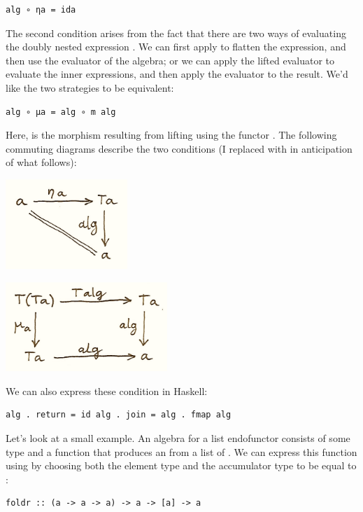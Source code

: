 \begin{verbatim}
alg ∘ ηa = ida
\end{verbatim}

The second condition arises from the fact that there are two ways of
evaluating the doubly nested expression . We can first
apply  to flatten the expression, and then use the evaluator
of the algebra; or we can apply the lifted evaluator to evaluate the
inner expressions, and then apply the evaluator to the result. We'd like
the two strategies to be equivalent:

\begin{verbatim}
alg ∘ μa = alg ∘ m alg
\end{verbatim}

Here,  is the morphism resulting from lifting
 using the functor . The following commuting
diagrams describe the two conditions (I replaced  with
 in anticipation of what follows):

\includegraphics[width=1.81250in]{images/talg1.png}

\includegraphics[width=2.40625in]{images/talg2.png}

We can also express these condition in Haskell:

\begin{verbatim}
alg . return = id alg . join = alg . fmap alg
\end{verbatim}

Let's look at a small example. An algebra for a list endofunctor
consists of some type  and a function that produces an
 from a list of . We can express this function using
 by choosing both the element type and the accumulator
type to be equal to :

\begin{verbatim}
foldr :: (a -> a -> a) -> a -> [a] -> a
\end{verbatim}

